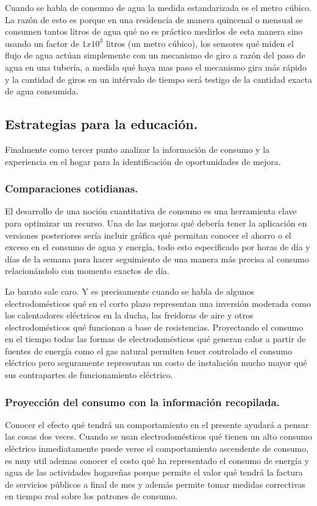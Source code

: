 \documentclass[a4paper,man,natbib]{apa6}
\begin{document}
Cuando se habla de consumo de agua la medida estandarizada es el metro cúbico. La razón de esto es porque en una residencia de manera quincenal o mensual se consumen tantos litros de agua qué no es práctico medirlos de esta manera sino usando un factor de $1x10^3$ litros (un metro cúbico), los sensores qué miden el flujo de agua actúan simplemente con un mecanismo de giro a razón del paso de agua en una tubería, a medida qué haya mas paso el mecanismo gira más rápido y la cantidad de giros en un intérvalo de tiempo será testigo de la cantidad exacta de agua consumida.


\subsection{Estrategias para la educación.}
Finalmente como tercer punto analizar la información de consumo y la experiencia en el hogar para la identificación de oportunidades de mejora.
\newline
\subsubsection{Comparaciones cotidianas.}
El desarrollo de una noción cuantitativa de consumo es una herramienta clave para optimizar un recurso. Una de las mejoras qué debería tener la aplicación en versiones posteriores sería incluir gráfica qué permitan conocer el ahorro o el exceso en el consumo de agua y energía, todo esto especificado por horas de día y días de la semana para hacer seguimiento de una manera más precisa al consumo relacionándolo con momento exactos de día.
\newline

Lo barato sale caro. Y es precisamente cuando se habla de algunos electrodomésticos qué en el corto plazo representan una inversión moderada como los calentadores eléctricos en la ducha, las freidoras de aire y otros electrodomésticos qué funcionan a base de resistencias. Proyectando el consumo en el tiempo todas las formas de electrodomésticos qué generan calor a partir de fuentes de energía como el gas natural permiten tener controlado el consumo eléctrico pero seguramente representan un costo de instalación mucho mayor qué sus contrapartes de funcionamiento eléctrico.\newline

\subsubsection{Proyección del consumo con la información recopilada.}
Conocer el efecto qué tendrá un comportamiento en el presente ayudará a pensar las cosas dos veces. Cuando se usan electrodomésticos qué tienen un alto consumo eléctrico inmediatamente puede verse el comportamiento ascendente de consumo, es muy util ademas conocer el costo qué ha representado el consumo de energía y agua de las actividades hogareñas porque permite el valor qué tendrá la factura de servicios públicos a final de mes y además permite tomar medidas correctivas en tiempo real sobre los patrones de consumo.
\newline
\end{document}
